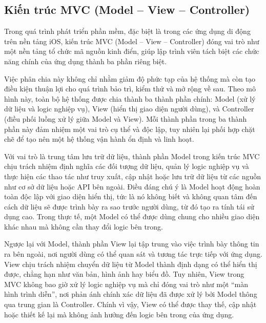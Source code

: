 \subsection{Kiến trúc MVC (Model – View – Controller)}
\renewcommand{\labelitemi}{--}    
    \begin{flushleft}
        \hspace*{0.8cm}Trong quá trình phát triển phần mềm, đặc biệt là trong các ứng dụng di động trên nền tảng iOS, kiến trúc MVC (Model – View – Controller) đóng vai trò như một nền tảng tổ chức mã nguồn kinh điển, giúp lập trình viên tách biệt các chức năng chính của ứng dụng thành ba phần riêng biệt.
    \end{flushleft}

    \begin{flushleft}
      \hspace*{0.8cm}Việc phân chia này không chỉ nhằm giảm độ phức tạp của hệ thống mà còn tạo điều kiện thuận lợi cho quá trình bảo trì, kiểm thử và mở rộng về sau. Theo mô hình này, toàn bộ hệ thống được chia thành ba thành phần chính: Model (xử lý dữ liệu và logic nghiệp vụ), View (hiển thị giao diện người dùng), và Controller (điều phối luồng xử lý giữa Model và View). Mỗi thành phần trong ba thành phần này đảm nhiệm một vai trò cụ thể và độc lập, tuy nhiên lại phối hợp chặt chẽ để tạo nên một hệ thống vận hành ổn định và linh hoạt.
    \end{flushleft}

    \begin{flushleft}
      \hspace*{0.8cm}Với vai trò là trung tâm lưu trữ dữ liệu, thành phần Model trong kiến trúc MVC chịu trách nhiệm định nghĩa các đối tượng dữ liệu, quản lý logic nghiệp vụ và thực hiện các thao tác như truy xuất, cập nhật hoặc lưu trữ dữ liệu từ các nguồn như cơ sở dữ liệu hoặc API bên ngoài. Điều đáng chú ý là Model hoạt động hoàn toàn độc lập với giao diện hiển thị, tức là nó không biết và không quan tâm đến cách dữ liệu sẽ được trình bày ra sao trước người dùng, từ đó tạo ra tính tái sử dụng cao. Trong thực tế, một Model có thể được dùng chung cho nhiều giao diện khác nhau mà không cần thay đổi logic bên trong.
    \end{flushleft}

    \begin{flushleft}
      \hspace*{0.8cm}Ngược lại với Model, thành phần View lại tập trung vào việc trình bày thông tin ra bên ngoài, nơi người dùng có thể quan sát và tương tác trực tiếp với ứng dụng. View chịu trách nhiệm chuyển dữ liệu từ Model thành định dạng có thể hiển thị được, chẳng hạn như văn bản, hình ảnh hay biểu đồ. Tuy nhiên, View trong MVC không bao giờ xử lý logic nghiệp vụ mà chỉ đóng vai trò như một “màn hình trình diễn”, nơi phản ánh chính xác dữ liệu đã được xử lý bởi Model thông qua trung gian là Controller. Chính vì vậy, View có thể được thay thế, cập nhật hoặc thiết kế lại mà không ảnh hưởng đến logic bên trong của ứng dụng.
    \end{flushleft}

